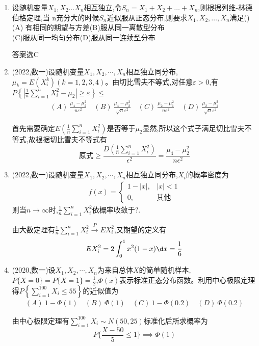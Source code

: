 \documentclass[12pt, a4paper, oneside, UTF8]{ctexbook}
\begin{document}
\begin{enumerate}[label=\arabic*.]
    \item 设随机变量$X_1,X_2\ldots X_n$相互独立,令$S_n=X_1+X_2+\ldots+X_n$,则根据列维-林德伯格定理,当
    n充分大的时候$S_n$近似服从正态分布,则要求$X_1,X_2,\ldots,X_n$满足() \\
    (A) 有相同的期望与方差\qquad (B)服从同一离散型分布 \\
    (C)服从同一均匀分布\qquad (D)服从同一连续型分布
    \begin{solution}
        答案选C
    \end{solution}
    \item (2022,数一)设随机变量$X_1,X_2,\cdots,X_n$相互独立同分布,$\mu_k=E(X_i^k)(k=1,2,3,4)$。由切比雪夫不等式,对任意$\varepsilon>0$,有
        $P\left\{\left|\frac{1}{n}\sum_{i=1}^n X_i^2-\mu_2\right|\geq\varepsilon\right\}\leq$
    \begin{align*}
        (A)\ \frac{\mu_4-\mu_2^2}{n\varepsilon^2} \quad (B)\ \frac{\mu_4-\mu_2^2}{\sqrt{n}\varepsilon^2} \quad (C)\ \frac{\mu_2-\mu_1^2}{n\varepsilon^2} \quad (D)\ \frac{\mu_2-\mu_1^2}{\sqrt{n}\varepsilon^2}
    \end{align*}
    
    \begin{solution}
    首先需要确定$E(\frac{1}{n}\sum_{i=1}^n X_i^2)$是否等于$\mu_2$显然,所以这个式子满足切比雪夫不等式,故根据切比雪夫不等式有
    \[
    \text{原式}\geq \frac{D(\frac{1}{n}\sum_{i=1}^n X_i^2)}{\epsilon^2}=\frac{\mu_4-\mu_2^2}{n\epsilon^2}
    \]
    \end{solution}
    
    \item (2022,数一)设随机变量$X_1,X_2,\cdots,X_n$相互独立同分布,$X_i$的概率密度为
    \begin{align*}
        f(x)=\begin{cases}
            1-|x|, & |x|<1 \\
            0, & \text{其他}
        \end{cases}
    \end{align*}
    则当$n\rightarrow\infty$时,$\frac{1}{n}\sum_{i=1}^n X_i^2$依概率收敛于?.
    
    \begin{solution}
    由大数定理有$\frac{1}{n}\sum_{i=1}^n X_i^2\xrightarrow{P}EX_i^2$,又期望的定义有
    \[
    EX_i^2=2\int_{0}^{1}x^2(1-x)\d x = \frac{1}{6}
    \]
    \end{solution}
    
    \item (2020,数一)设$X_1,X_2,\cdots,X_n$为来自总体$X$的简单随机样本,$P\{X=0\}=P\{X=1\}=\frac{1}{2}$,$\Phi(x)$表示标准正态分布函数。利用中心极限定理得$P\left\{\sum_{i=1}^{100} X_i\leq 55\right\}$的近似值为
    \begin{align*}
        (A)\ 1-\Phi(1) \quad (B)\ \Phi(1) \quad (C)\ 1-\Phi(0.2) \quad (D)\ \Phi(0.2)
    \end{align*}
    
    \begin{solution}
    由中心极限定理有$\sum_{i=1}^{100} X_i\sim N(50, 25)$标准化后所求概率为 
    \[
    P\{\frac{X-50}{5}\leq 1\} \implies \Phi(1)
    \]
    \end{solution}
\end{enumerate}

\ifx\allfiles\undefined
\end{document}
